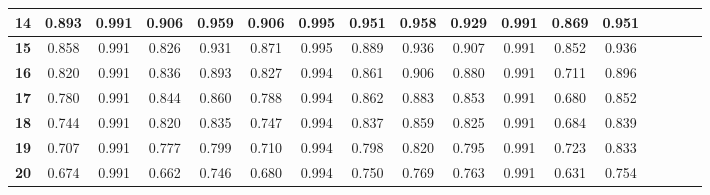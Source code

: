\begin{table*}[!t]
\begin{tabular}{|c|c|c|c|c|c|c|c|c|c|c|c|c|c|c|c|c|}
\hline
\bfseries 14 & 0.893 & 0.991 & 0.906 & 0.959 & 0.906 & 0.995 & 0.951 & 0.958 & 0.929 & 0.991 & 0.869 & 0.951 \\
\hline
\bfseries 15 & 0.858 & 0.991 & 0.826 & 0.931 & 0.871 & 0.995 & 0.889 & 0.936 & 0.907 & 0.991 & 0.852 & 0.936 \\
\hline
\bfseries 16 & 0.820 & 0.991 & 0.836 & 0.893 & 0.827 & 0.994 & 0.861 & 0.906 & 0.880 & 0.991 & 0.711 & 0.896 \\
\hline
\bfseries 17 & 0.780 & 0.991 & 0.844 & 0.860 & 0.788 & 0.994 & 0.862 & 0.883 & 0.853 & 0.991 & 0.680 & 0.852 \\
\hline
\bfseries 18 & 0.744 & 0.991 & 0.820 & 0.835 & 0.747 & 0.994 & 0.837 & 0.859 & 0.825 & 0.991 & 0.684 & 0.839 \\
\hline
\bfseries 19 & 0.707 & 0.991 & 0.777 & 0.799 & 0.710 & 0.994 & 0.798 & 0.820 & 0.795 & 0.991 & 0.723 & 0.833 \\
\hline
\bfseries 20 & 0.674 & 0.991 & 0.662 & 0.746 & 0.680 & 0.994 & 0.750 & 0.769 & 0.763 & 0.991 & 0.631 & 0.754 \\
\hline
\end{tabular}
\end{table*}

